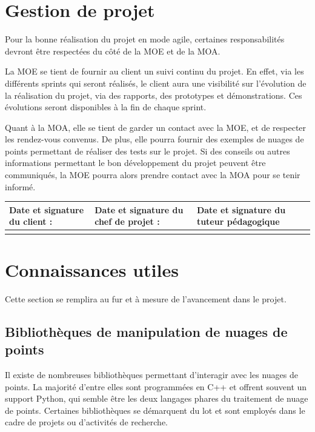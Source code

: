\documentclass[12pt,titlepage,french]{article}
\begin{document}
\section{Gestion de projet}

Pour la bonne réalisation du projet en mode agile, certaines responsabilités devront être respectées du côté de la MOE et de la MOA.

La MOE se tient de fournir au client un suivi continu du projet. En effet, via les différents sprints qui seront réalisés, le client aura une visibilité sur l'évolution de la réalisation du projet, via des rapports, des prototypes et démonstrations. Ces évolutions seront disponibles à la fin de chaque sprint.

Quant à la MOA, elle se tient de garder un contact avec la MOE, et de respecter les rendez-vous convenus. De plus, elle pourra fournir des exemples de nuages de points permettant de réaliser des tests sur le projet. Si des conseils ou autres informations permettant le bon développement du projet peuvent être communiqués, la MOE pourra alors prendre contact avec la MOA pour se tenir informé.\\
\noindent\begin{tabularx}{\textwidth}{|X|X|X|}
    \hline
    \textbf{Date et signature du client :} & \textbf{Date et signature du chef de projet :} & \textbf{Date et signature du tuteur pédagogique}\\
    \hline
   \rule{0pt}{3cm} &
    &\\
    \hline
    
\end{tabularx}

\section{Connaissances utiles}

Cette section se remplira au fur et à mesure de l'avancement dans le projet.

\subsection*{Bibliothèques de manipulation de nuages de points}
Il existe de nombreuses bibliothèques permettant d'interagir avec les nuages de points. La majorité d'entre elles sont programmées en C++ et offrent souvent un support Python, qui semble être les deux langages phares du traitement de nuage de points.
Certaines bibliothèques se démarquent du lot et sont employés dans le cadre de projets ou d'activités de recherche.
\end{document}
